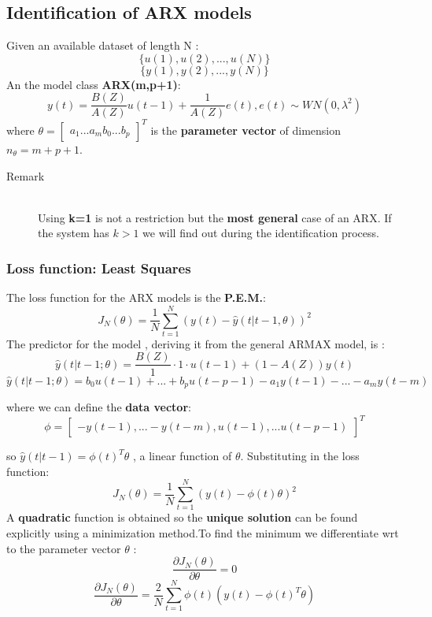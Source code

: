 \subsection{Identification of ARX models}
Given an available dataset of length N :
$$ \{ u(1),u(2),...,u(N)\}$$
$$ \{ y(1),y(2),...,y(N)\}$$
An the model class \textbf{ARX(m,p+1)}:
$$ y(t) = \frac{B(Z)}{A(Z)}u(t-1)+\frac{1}{A(Z)}e(t) , e(t) \sim WN(0,\lambda^2)$$
where
 $ \theta = \begin{bmatrix}
                a_1  
                ...  
                a_m 
                b_0  
                ...  
                b_p 
             \end{bmatrix}^T$ 
is the \textbf{parameter vector} of dimension $n_{\theta} = m+p+1$.
\begin{description}
\item[Remark]\hfill\\
Using \textbf{k=1} is not a restriction but the \textbf{most general} case of an ARX. If the system has $k > 1$ we will find out during the identification process.
\end{description}
\subsubsection{Loss function: Least Squares}
The loss function for the ARX models is the \textbf{P.E.M.}:
\[
\boxed{J_N(\theta) = \frac{1}{N} \sum\limits_{t=1}^{N}(y(t)-\hat{y}(t|t-1,\theta))^2}
\]
The predictor for the model , deriving it from the  general ARMAX model, is :
$$ \hat{y}(t|t-1;\theta) = \frac{B(Z)}{1}\cdot 1\cdot u(t-1)+ (1-A(Z))y(t)$$
\[
\boxed{\hat{y}(t|t-1;\theta) = b_0u(t-1)+...+b_pu(t-p-1)-a_1y(t-1)-...-a_my(t-m)}
\]

where we can define the \textbf{data vector}:
$$ \phi = \begin{bmatrix}
                -y(t-1),  
                ...  
                -y(t-m) ,
                
                u(t-1),
                ...  
                u(t-p-1) 
             \end{bmatrix}^T$$ 

so $\hat{y}(t|t-1) = \phi(t)^T \theta$ , a linear function of $\theta$. Substituting in the loss function:
$$ J_N(\theta)= \frac{1}{N} \sum\limits_{t=1}^{N}(y(t) - \phi(t)\theta)^2$$
A \textbf{quadratic} function is obtained so the \textbf{unique solution} can be found explicitly using a minimization method.To find the minimum we differentiate wrt to the parameter vector $\theta$ : 
$$ \frac{\partial{J_N(\theta)}}{\partial \theta} = 0$$
$$ \frac{\partial{J_N(\theta)}}{\partial \theta} = \frac{2}{N}\sum\limits_{t=1}^{N}\phi(t)(y(t)-\phi(t)^T\theta)$$

